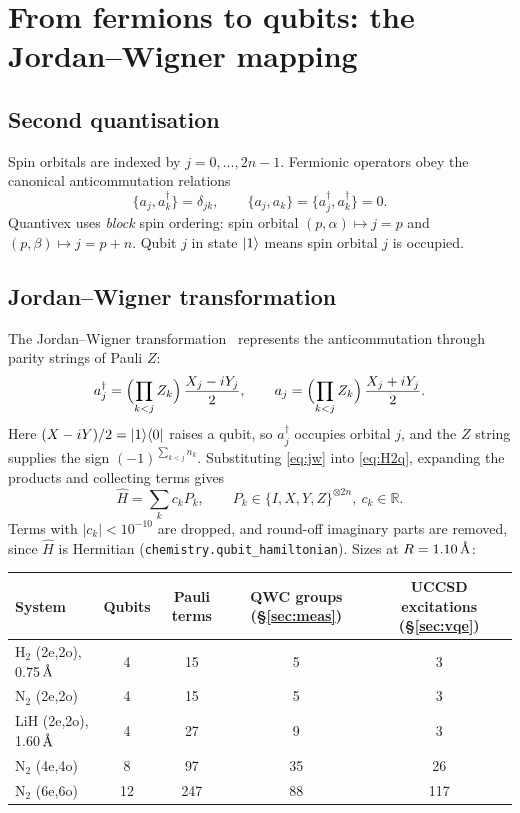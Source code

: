 \documentclass[10pt,a4paper]{article}
\newcommand{\Ang}{\ensuremath{\,\text{\normalfont\AA}}}
\newcommand{\cre}[1]{a^{\dagger}_{#1}}
\newcommand{\ann}[1]{a_{#1}}
\newcommand{\code}[1]{\texttt{\small #1}}
\begin{document}
\section{From fermions to qubits: the Jordan--Wigner mapping}\label{sec:jw}
\subsection{Second quantisation}
Spin orbitals are indexed by $j=0,\dots,2n-1$. Fermionic operators obey the canonical anticommutation relations
\begin{equation}
\{\ann{j},\cre{k}\}=\delta_{jk},\qquad \{\ann{j},\ann{k}\}=\{\cre{j},\cre{k}\}=0 .
\end{equation}
Quantivex uses \emph{block} spin ordering: spin orbital $(p,\alpha)\mapsto j=p$ and $(p,\beta)\mapsto j=p+n$. Qubit $j$ in state $\ket1$ means spin orbital $j$ is occupied.

\subsection{Jordan--Wigner transformation}
The Jordan--Wigner transformation~\cite{JordanWigner1928,McArdle2020} represents the anticommutation through parity strings of Pauli $Z$:
\begin{equation}\label{eq:jw}
\cre{j} = \Bigl(\prod_{k<j} Z_k\Bigr)\,\frac{X_j - iY_j}{2},\qquad
\ann{j} = \Bigl(\prod_{k<j} Z_k\Bigr)\,\frac{X_j + iY_j}{2}.
\end{equation}
Here $(X-iY)/2=\ket1\!\bra0$ raises a qubit, so $\cre j$ occupies orbital $j$, and the $Z$ string supplies the sign $(-1)^{\sum_{k<j}n_k}$. Substituting \eqref{eq:jw} into \eqref{eq:H2q}, expanding the products and collecting terms gives
\begin{equation}
\hat H=\sum_{k} c_k P_k,\qquad P_k\in\{I,X,Y,Z\}^{\otimes 2n},\ c_k\in\mathbb R .
\end{equation}
Terms with $|c_k|<10^{-10}$ are dropped, and round-off imaginary parts are removed, since $\hat H$ is Hermitian (\code{chemistry.qubit\_hamiltonian}). Sizes at $R=1.10\Ang$:
\begin{center}\small
\begin{tabular}{@{}lcccc@{}}\toprule
System & Qubits & Pauli terms & QWC groups (\S\ref{sec:meas}) & UCCSD excitations (\S\ref{sec:vqe})\\\midrule
H$_2$ (2e,2o), 0.75\Ang & 4 & 15 & 5 & 3\\
N$_2$ (2e,2o) & 4 & 15 & 5 & 3\\
LiH (2e,2o), 1.60\Ang & 4 & 27 & 9 & 3\\
N$_2$ (4e,4o) & 8 & 97 & 35 & 26\\
N$_2$ (6e,6o) & 12 & 247 & 88 & 117\\\bottomrule
\end{tabular}
\end{center}
\end{document}
